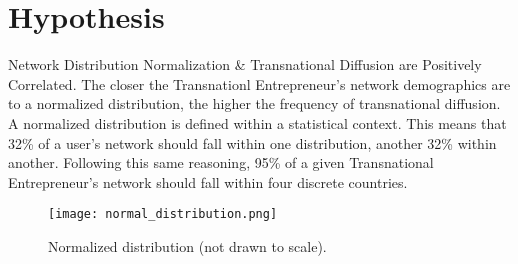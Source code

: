 \section{Hypothesis}
Network Distribution Normalization \& Transnational Diffusion are
Positively Correlated. The closer the Transnationl Entrepreneur's
network demographics are to a normalized distribution, the higher the
frequency of transnational diffusion. A normalized distribution is
defined within a statistical context. This means that 32\% of a user's
network should fall within one distribution, another 32\% within
another. Following this same reasoning, 95\% of a given Transnational
Entrepreneur's network should fall within four discrete countries.
\begin{figure}[!ht]
  \centering
  \texttt{[image: normal\_distribution.png]}
  \caption{Normalized distribution (not drawn to scale).}
\end{figure}
